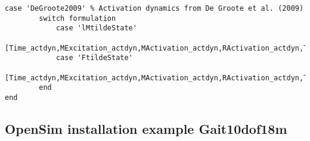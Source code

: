 \documentclass[a4paper,oneside,11pt]{article}
\begin{document}
\begin{lstlisting}[frame=none,basicstyle=\tiny]
    case 'DeGroote2009' % Activation dynamics from De Groote et al. (2009)  
        switch formulation
            case 'lMtildeState'
                [Time_actdyn,MExcitation_actdyn,MActivation_actdyn,RActivation_actdyn,TForcetilde_actdyn,TForce_actdyn,lMtilde_actdyn,lM_actdyn,MuscleNames_actdyn,OptInfo_actdyn,DatStore_actdyn]=SolveMuscleRedundancy_lMtildeState_actdyn(model_path,IK_path,ID_path,time,OutPath,Misc);
            case 'FtildeState'   
                [Time_actdyn,MExcitation_actdyn,MActivation_actdyn,RActivation_actdyn,TForcetilde_actdyn,TForce_actdyn,lMtilde_actdyn,lM_actdyn,MuscleNames_actdyn,OptInfo_actdyn,DatStore_actdyn]=SolveMuscleRedundancy_FtildeState_actdyn(model_path,IK_path,ID_path,time,OutPath,Misc);
        end
end
\end{lstlisting}

\subsection{OpenSim installation example Gait10dof18m}
\end{document}
